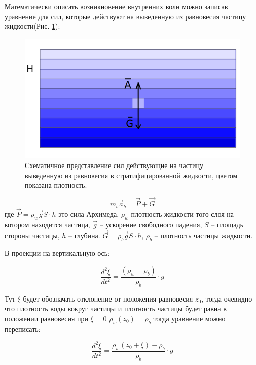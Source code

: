 Математически описать возникновение внутренних волн можно записав уравнение для сил, которые действуют на выведенную из равновесия частицу жидкости(Рис. \ref{fig:Forces}):

\begin{figure}
    \centering
    \includegraphics[scale=0.8]{Figs/Forces.png}
    \caption{Схематичное представление сил действующие на частицу выведенную из равновесия в стратифицированной жидкости, цветом показана плотность.}
    \label{fig:Forces}
\end{figure}

\begin{equation}
    m_b \vec{a}_b = \vec{P} + \vec{G}
\end{equation}
где $\vec{P}=\rho_w \vec{g} S \cdot h$ это сила Архимеда, $\rho_w$ плотность жидкости того слоя на котором находится частица, $\vec{g}$ -- ускорение свободного падения, $S$ -- площадь стороны частицы, $h$  -- глубина. $\vec{G} = \rho_b \vec{g} S \cdot h$,  $\rho_b$ -- плотность частицы жидкости.

В проекции на вертикальную ось:

\begin{equation}
    \frac{d^2 \xi}{dt^2} = \frac{(\rho_w-\rho_b)}{\rho_b}\cdot g
\end{equation}

Тут $\xi$ будет обозначать отклонение от положения равновесия $z_0$, тогда очевидно что плотность воды вокруг частицы и плотность частицы будет равна в положении равновесия при $\xi=0$ $\rho_w(z_0)=\rho_b$ тогда уравнение можно переписать:

\begin{equation}
    \frac{d^2 \xi}{dt^2} = \frac{\rho_w(z_0+\xi)-\rho_b}{\rho_b}\cdot g
    \label{eq:beg}
\end{equation}

